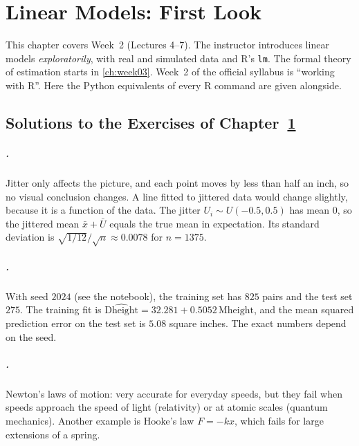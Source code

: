 \chapter{Linear Models: First Look}\label{ch:week02}

This chapter covers Week~2 (Lectures 4--7). The instructor introduces linear models
\emph{exploratorily}, with real and simulated data and R's \texttt{lm}. The formal theory of
estimation starts in \cref{ch:week03}. Week~2 of the official syllabus is ``working with R''.
Here the Python equivalents of every R command are given alongside.






\section*{Solutions to the Exercises of Chapter~\ref{ch:week02}}

\paragraph{.}
Jitter only affects the picture, and each point moves by less than half an inch, so no visual
conclusion changes. A line fitted to jittered data would change slightly, because it is a
function of the data. The jitter $U_i\sim U(-0.5,0.5)$ has mean $0$, so the jittered mean
$\bar x+\bar U$ equals the true mean in expectation. Its standard deviation is
$\sqrt{1/12}/\sqrt n\approx 0.0078$ for $n=1375$.

\paragraph{.}
With seed $2024$ (see the notebook), the training set has $825$ pairs and the test set $275$.
The training fit is $\widehat{\text{Dheight}}=32.281+0.5052\,\text{Mheight}$, and the mean
squared prediction error on the test set is $5.08$ square inches. The exact numbers depend on the
seed.

\paragraph{.}
Newton's laws of motion: very accurate for everyday speeds, but they fail when speeds approach
the speed of light (relativity) or at atomic scales (quantum mechanics). Another example is
Hooke's law $F=-kx$, which fails for large extensions of a spring.

